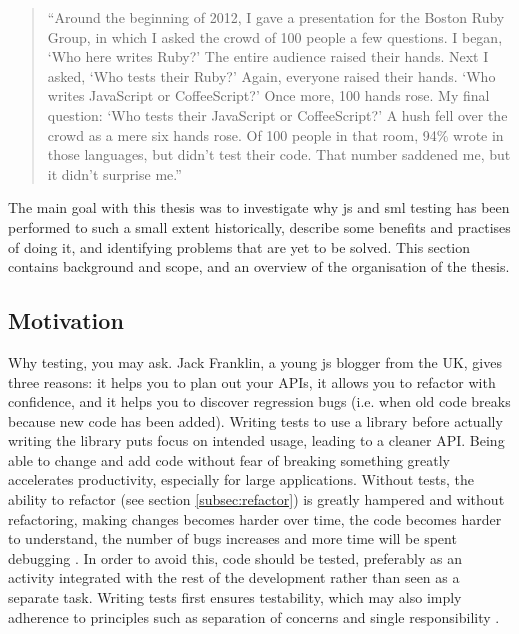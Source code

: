 \documentclass[11pt]{article}
\begin{document}
\begin{quote}
``Around the beginning of 2012, I gave a presentation for the Boston Ruby Group, in which I asked the crowd of 100 people a few questions. I began, `Who here writes Ruby?' The entire audience raised their hands. Next I asked, `Who tests their Ruby?' Again, everyone raised their hands. `Who writes JavaScript or CoffeeScript?' Once more, 100 hands rose. My final question: `Who tests their JavaScript or CoffeeScript?' A hush fell over the crowd as a mere six hands rose. Of 100 people in that room, 94\% wrote in those languages, but didn't test their code. That number saddened me, but it didn't surprise me.''
\end{quote}

\begin{center}
\end{center}

The main goal with this thesis was to investigate why \gls{js} and \gls{sml} testing has been performed to such a small extent historically, describe some benefits and practises of doing it, and identifying problems that are yet to be solved. This section contains background and scope, and an overview of the organisation of the thesis.

\subsection{Motivation}
\label{subsec:motivation}

Why testing, you may ask. Jack Franklin, a young \gls{js} blogger from the UK, gives three reasons: it helps you to plan out your APIs, it allows you to refactor with confidence, and it helps you to discover regression bugs (i.e. when old code breaks because new code has been added). Writing tests to use a library before actually writing the library puts focus on intended usage, leading to a cleaner API. Being able to change and add code without fear of breaking something greatly accelerates productivity, especially for large applications. \cite{JackFranklin} Without tests, the ability to refactor (see section \ref{subsec:refactor}) is greatly hampered and without refactoring, making changes becomes harder over time, the code becomes harder to understand, the number of bugs increases and more time will be spent debugging \cite[p.~47-49]{Refactoring}. In order to avoid this, code should be tested, preferably as an activity integrated with the rest of the development rather than seen as a separate task. Writing tests first ensures testability, which may also imply adherence to principles such as separation of concerns and single responsibility \cite[p.~35-37]{Clean}.
\end{document}
